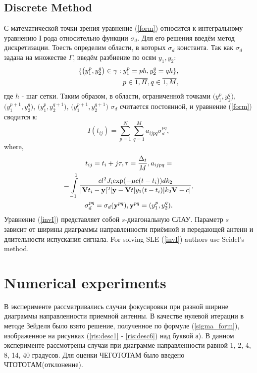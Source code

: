 \documentclass{procDDs}
\begin{document}
\subsection{Discrete Method}
С математической точки зрения уравнение (\ref{form}) относится к интегральному уравнению I рода относительно функции $\sigma_d$. Для его решения введём метод дискретизации. Тоесть определим области, в которых $\sigma_d$  константа. Так как $\sigma_d$ задана на множестве $\Gamma$, введём разбиение по осям $y_1, y_2$:
\begin{align}
	\{ \big( y_1^p, y_2^q \big) \in\gamma: y_1^p = ph, y_2^q = qh \}, \notag \\ 
	p \in \overline{1, H}, q \in \overline{1, M}, 
\end{align}
где $h$ - шаг сетки. Таким образом, в области, ограниченной точками $\big(y_1^p, y_2^q\big)$, $\big(y_1^{p+1}, y_2^q\big)$, $\big(y_1^p, y_2^{q+1}\big)$, $\big(y_1^{p+1}, y_2^{q+1}\big)$ $\sigma_d$ считается постоянной, и уравнение (\ref{form}) сводится к:
\begin{equation}
\label{invI}
	I(t_{ij}) = \sum \limits_{p=1}^{N} \sum \limits_{q=1}^{M} a_{ijpq}\sigma_d^{pq},
\end{equation}
where,
\begin{multline*}
t_{ij} = t_i+j\tau, \tau = \frac{\Delta_t}{M}, a_{ijpq} = \\ 
=  \int\limits_{-1}^{1}
\frac{cl^2J_i \text{exp}(-\mu c(t-t_i))dk_2}{|\mathbf{V}t_i-\mathbf{y}|^2|\mathbf{y}-\mathbf{V}t|y_1(t-t_i)|k_2 \mathbf{V}-c|}, \\
\sigma_d^{pq} = \sigma_d(\textbf{y}^{pq}), \textbf{y}^{pq} = (y_1^p, y_2^q).
\end{multline*}
Уравнение (\ref{invI}) представляет собой $s$-диагональную СЛАУ. Параметр $s$ зависит от ширины диаграммы направленности приёмной и передающей антенн и длительности испускания сигнала. For solving SLE (\ref{invI}) authors use  Seidel's method.

\section{Numerical experiments}
В эксперименте рассматривались случаи фокусировки при разной ширине диаграммы направленности приемной антенны. В качестве нулевой итерации в методе Зейделя было взято решение, полученное по формуле (\ref{sigma_form}), изображенное на рисунках (\ref{ris:desc1} - \ref{ris:desc6}) над буквой а). В данном эксперименте рассмотрены случаи при диаграмме направленности равной 1, 2, 4, 8, 14, 40 градусов. Для оценки ЧЕГОТОТАМ было введено ЧТОТОТАМ(отклонение). 
\end{document}

